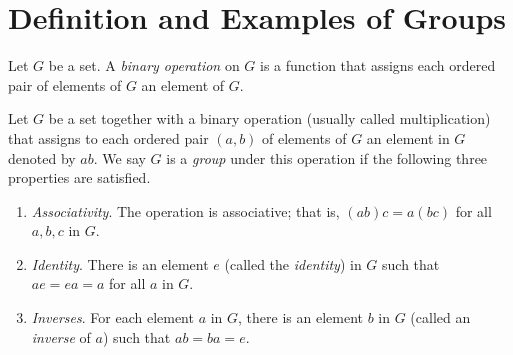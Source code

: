 \section{Definition and Examples of Groups}

\begin{definition}
	Let $G$ be a set. A \textit{binary operation} on $G$ is a function that assigns each ordered pair of elements of $G$ an element of $G$.
\end{definition}

\begin{definition}[Group]
	Let $G$ be a set together with a binary operation (usually called multiplication) that assigns to each ordered pair $(a, b)$ of elements of $G$ an element in $G$ denoted by $ab$. We say $G$ is a \textit{group} under this operation if the following three properties are satisfied.
	\begin{enumerate}
		\item \textit{Associativity}. The operation is associative; that is, $(ab)c = a(bc)$ for all $a,b,c$ in $G$.
		\item \textit{Identity}. There is an element $e$ (called the \textit{identity}) in $G$ such that $ae = ea = a$ for all $a$ in $G$.
		\item \textit{Inverses}. For each element $a$ in $G$, there is an element $b$ in $G$ (called an \textit{inverse} of $a$) such that $ab = ba = e$.
	\end{enumerate}
\end{definition}
